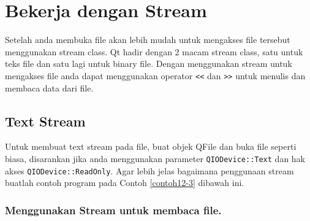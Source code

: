 \section{Bekerja dengan Stream}\label{bekerja-dengan-stream}

Setelah anda membuka file akan lebih mudah untuk mengakses file tersebut
menggunakan stream class. Qt hadir dengan 2 macam stream class, satu
untuk teks file dan satu lagi untuk binary file. Dengan menggunakan
stream untuk mengakses file anda dapat menggunakan operator
\texttt{\textless{}\textless{}} dan
\texttt{\textgreater{}\textgreater{}} untuk menulis dan membaca data
dari file.

\subsection{Text Stream}\label{text-stream}

Untuk membuat text stream pada file, buat objek QFile dan buka file
seperti biasa, disarankan jika anda menggunakan parameter
\texttt{QIODevice::Text} dan hak akses \texttt{QIODevice::ReadOnly}.
Agar lebih jelas bagaimana penggunaan stream buatlah contoh program pada
Contoh \ref{contoh12-3} dibawah ini.

\subsubsection*{Menggunakan Stream untuk membaca file.}

